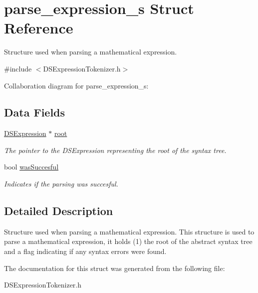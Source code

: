 \hypertarget{structparse__expression__s}{
\section{parse\_\-expression\_\-s Struct Reference}
\label{structparse__expression__s}
}


Structure used when parsing a mathematical expression.  




{\ttfamily \#include $<$DSExpressionTokenizer.h$>$}



Collaboration diagram for parse\_\-expression\_\-s:\subsection*{Data Fields}
\begin{DoxyCompactItemize}
\item 
\hypertarget{structparse__expression__s_a7be7d3c57dc4bb492e758ba6e060c75b}{
\hyperlink{structdsexpression}{DSExpression} $\ast$ \hyperlink{structparse__expression__s_a7be7d3c57dc4bb492e758ba6e060c75b}{root}}
\label{structparse__expression__s_a7be7d3c57dc4bb492e758ba6e060c75b}

\begin{DoxyCompactList}\small\item\em The pointer to the DSExpression representing the root of the syntax tree. \item\end{DoxyCompactList}\item 
\hypertarget{structparse__expression__s_a61b4dce0857cd06c2779029a5b2bdd7d}{
bool \hyperlink{structparse__expression__s_a61b4dce0857cd06c2779029a5b2bdd7d}{wasSuccesful}}
\label{structparse__expression__s_a61b4dce0857cd06c2779029a5b2bdd7d}

\begin{DoxyCompactList}\small\item\em Indicates if the parsing was succesful. \item\end{DoxyCompactList}\end{DoxyCompactItemize}


\subsection{Detailed Description}
Structure used when parsing a mathematical expression. This structure is used to parse a mathematical expression, it holds (1) the root of the abstract syntax tree and a flag indicating if any syntax errors were found. 

The documentation for this struct was generated from the following file:\begin{DoxyCompactItemize}
\item 
DSExpressionTokenizer.h\end{DoxyCompactItemize}

